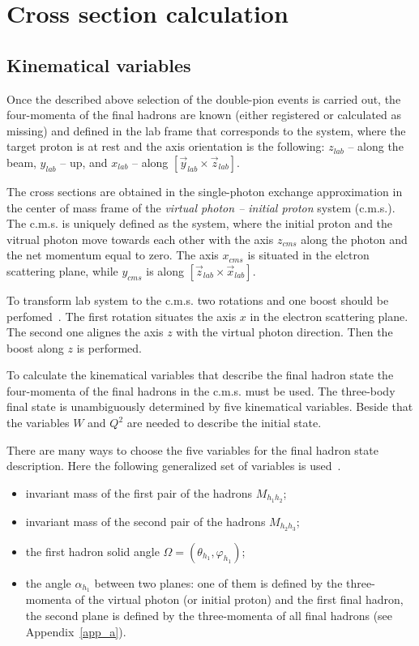 \documentclass[prc,twocolumn,superscriptaddress,showpacs,amssymb,amsmath,amsfonts,linenumbers,aps]{revtex4-1}
\begin{document}
\section{Cross section calculation}

\subsection{Kinematical variables}
\label{sec_kin_var}

Once the described above selection of the double-pion events is carried out, the four-momenta of the final hadrons are known (either registered or calculated as missing) and defined in the lab frame that corresponds to the system, where the target proton is at rest and the axis orientation is the following: $z_{lab}$ -- along the beam, $y_{lab}$ -- up, and $x_{lab}$ -- along $[\vec y_{lab} \times \vec z_{lab}]$.


The cross sections are obtained in the single-photon exchange approximation in the center of mass frame of the {\em virtual photon -- initial proton} system (c.m.s.).   
The c.m.s. is uniquely defined as the system, where the initial proton and the vitrual photon move towards each other with the axis $z_{cms}$ along the photon and the net momentum equal to zero. The axis $x_{cms}$ is situated in the elctron scattering plane, while $y_{cms}$ is along $[\vec z_{lab} \times \vec x_{lab}]$.

To transform lab system to the c.m.s. two rotations and one
boost should be perfomed~\cite{Fed_an_note:2017}.
The first rotation situates the axis $x$ in the electron scattering plane.
The second one alignes the axis $z$ with the virtual photon direction. 
Then the boost along $z$ is performed. 


To calculate the kinematical variables that describe the final hadron state the four-momenta of the final hadrons in the c.m.s. must be used.
The three-body final state is 
unambiguously determined by five kinematical
variables. 
Beside that the variables $W$ and $Q^{2}$ are needed to describe the initial state.
 
There are many ways to choose the five variables for the final hadron state description. Here the following generalized set of
variables is used~\cite{Fed_an_note:2017,Byckling:1971vca}.

\begin{itemize}
\item invariant mass of the first pair of the
hadrons $M_{h_{1}h_{2}}$;
\item invariant mass of the second pair of the
hadrons $M_{h_{2}h_{3}}$;
\item the first hadron solid angle $\Omega = (\theta_{h_{1}}, \varphi_{h_{1}})$;
\item the angle $\alpha_{h_{1}}$ between two planes: one of
them is defined by the three-momenta of
the virtual photon (or initial proton) and the first final hadron, the second
plane is defined by the three-momenta of all final hadrons (see Appendix~\ref{app_a}).
\end{itemize}
\end{document}
